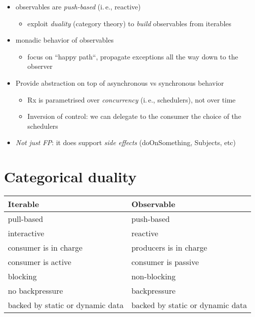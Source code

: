 \documentclass[10pt]{beamer}
\providecommand{\ie}{i.\,e.}
\begin{document}
\begin{frame}

	\begin{itemize}
				\item observables are \emph{push-based} (\ie, reactive)
			\begin{itemize}
		\item exploit \emph{duality} (category theory) to \emph{build} observables from iterables 
			\end{itemize}
		\item monadic behavior of observables 
			\begin{itemize}
				\item focus on ``happy path``, propagate exceptions all the way down to the observer 
			\end{itemize}
				\item Provide abstraction on top of asynchronous vs synchronous behavior 
			\begin{itemize}
		\item Rx is parametrised over \emph{concurrency} (\ie, schedulers), not over time
				\item Inversion of control: we can delegate to the consumer  the choice of the schedulers 
			\end{itemize}
		\item \emph{Not just FP}: it does support 
			\emph{side effects} (doOnSomething, Subjects, etc) 
	\end{itemize}

\end{frame}

\section{Categorical duality}

\begin{frame}[fragile]

	\begin{table}
		\centering
		\begin{tabular}{C{4cm}|C{4cm}}
			\toprule
			\textbf{Iterable} & \textbf{Observable}\\
			\midrule
			pull-based & push-based \\ 
			interactive & reactive \\
			consumer is in charge & producers is in charge \\
			consumer is active & consumer is passive \\ 
			blocking & non-blocking \\
			no backpressure & backpressure \\ 
			backed by static or dynamic data & backed by static or dynamic data\\
			\bottomrule
\end{tabular}
	\end{table}

\end{frame}
\end{document}
